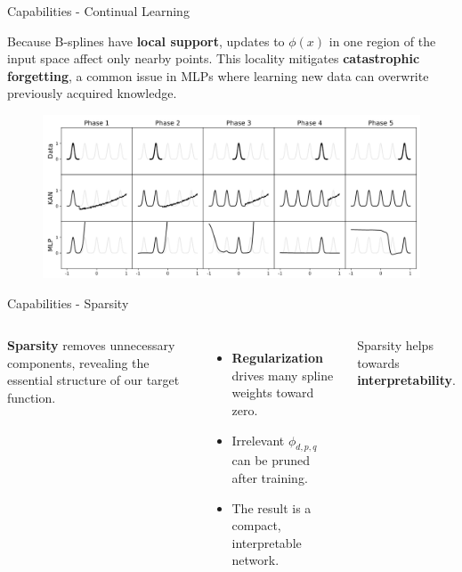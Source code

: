 \documentclass[aspectratio=169]{beamer}
\begin{document}

\begin{frame}{Capabilities - Continual Learning}
	
	Because B-splines have \textbf{local support}, updates to $\phi(x)$ in one region of the input space affect only nearby points.  
	This locality mitigates \textbf{catastrophic forgetting}, a common issue in MLPs where learning new data can overwrite previously acquired knowledge.
	
	\begin{figure}
		\centering
		\includegraphics[height=0.6\textheight]{../images/continual_learning.png}
	\end{figure}
	
\end{frame}



\begin{frame}{Capabilities - Sparsity}
	\begin{columns}[T,onlytextwidth]
		
		
		\textbf{Sparsity} removes unnecessary components, revealing the essential structure of our target function.
		
		\vspace{0.6em}
		\begin{itemize}
			\item \textbf{Regularization} drives many spline weights toward zero.
			\item Irrelevant $\phi_{d,p,q}$ can be pruned after training.
			\item The result is a compact, interpretable network.
		\end{itemize}
		
		Sparsity helps towards \textbf{interpretability}.
		
		\centering
		\resizebox{!}{0.75\textheight}{}
		
	\end{columns}
\end{frame}
\end{document}
